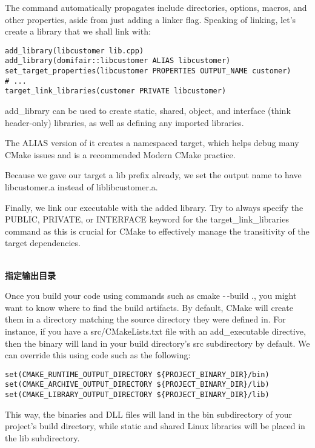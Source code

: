 The command automatically propagates include directories, options, macros, and other properties, aside from just adding a linker flag. Speaking of linking, let's create a library that we shall link with:

\begin{lstlisting}[style=styleCMake]
add_library(libcustomer lib.cpp)
add_library(domifair::libcustomer ALIAS libcustomer)
set_target_properties(libcustomer PROPERTIES OUTPUT_NAME customer)
# ...
target_link_libraries(customer PRIVATE libcustomer)
\end{lstlisting}

add\_library can be used to create static, shared, object, and interface (think header-only) libraries, as well as defining any imported libraries.

The ALIAS version of it creates a namespaced target, which helps debug many CMake issues and is a recommended Modern CMake practice.

Because we gave our target a lib prefix already, we set the output name to have libcustomer.a instead of liblibcustomer.a.

Finally, we link our executable with the added library. Try to always specify the PUBLIC, PRIVATE, or INTERFACE keyword for the target\_link\_libraries command as this is crucial for CMake to effectively manage the transitivity of the target dependencies.

\hspace*{\fill} \\ %
\noindent
\textbf{指定输出目录}

Once you build your code using commands such as cmake -\,-build ., you might want to know where to find the build artifacts. By default, CMake will create them in a directory matching the source directory they were defined in. For instance, if you have a src/CMakeLists.txt file with an add\_executable directive, then the binary will land in your build directory's src subdirectory by default. We can override this using code such as the following: 

\begin{lstlisting}[style=styleCMake]
set(CMAKE_RUNTIME_OUTPUT_DIRECTORY ${PROJECT_BINARY_DIR}/bin)
set(CMAKE_ARCHIVE_OUTPUT_DIRECTORY ${PROJECT_BINARY_DIR}/lib)
set(CMAKE_LIBRARY_OUTPUT_DIRECTORY ${PROJECT_BINARY_DIR}/lib)
\end{lstlisting}

This way, the binaries and DLL files will land in the bin subdirectory of your project's build directory, while static and shared Linux libraries will be placed in the lib subdirectory.

